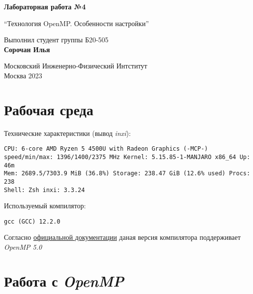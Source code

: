 \documentclass[a4paper, 12pt]{article}
\begin{document}
\hypersetup{pageanchor=false}
\begin{titlepage}
 \begin{center}
  \vspace*{1cm}

  \Huge
  \textbf{Лабораторная работа №4}

  \vspace{0.5cm}
  \LARGE
  ``Технология OpenMP. Особенности настройки''

  \vspace{1.5cm}
  Выполнил студент группы Б20-505\\
  \textbf{Сорочан Илья}

  \vfill

  \Large
  Московский Инженерно-Физический Интститут\\
  Москва 2023

 \end{center}
\end{titlepage}



\section{Рабочая среда}

Технические характеристики (вывод \textit{inxi}):
\begin{verbatim}
CPU: 6-core AMD Ryzen 5 4500U with Radeon Graphics (-MCP-)
speed/min/max: 1396/1400/2375 MHz Kernel: 5.15.85-1-MANJARO x86_64 Up: 46m
Mem: 2689.5/7303.9 MiB (36.8%) Storage: 238.47 GiB (12.6% used) Procs: 238
Shell: Zsh inxi: 3.3.24
\end{verbatim}

Используемый компилятор:
\begin{verbatim}
gcc (GCC) 12.2.0
\end{verbatim}

Согласно \href{https://www.openmp.org/resources/openmp-compilers-tools/}{официальной документации} даная версия компилятора поддерживает \textit{OpenMP 5.0}



\section{Работа с \textit{OpenMP}}
\end{document}

